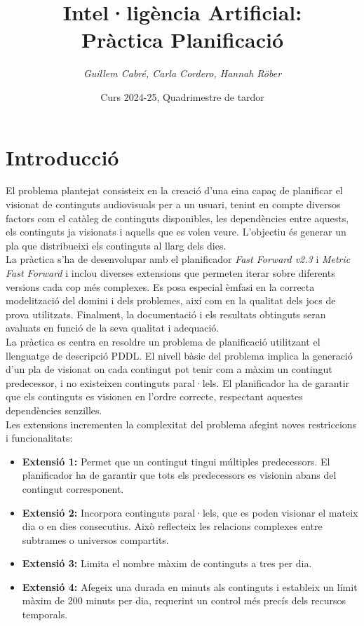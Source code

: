 \documentclass[a4paper]{article}
\title{\textbf{Intel·ligència Artificial:\\
		Pràctica Planificació}}
\author{\emph{Guillem Cabré, Carla Cordero, Hannah Röber}}
\date{Curs 2024-25, Quadrimestre de tardor}
\begin{document}
	
	\begin{titlepage}
		\clearpage\maketitle
		\thispagestyle{empty}
	\end{titlepage}
	
	\tableofcontents
	\clearpage
	
	\section{Introducció}
	
	El problema plantejat consisteix en la creació d'una eina capaç de planificar el visionat de continguts audiovisuals per a un usuari, tenint en compte diversos factors com el catàleg de continguts disponibles, les dependències entre aquests, els continguts ja visionats i aquells que es volen veure. L'objectiu és generar un pla que distribueixi els continguts al llarg dels dies. \\
	
	La pràctica s'ha de desenvolupar amb el planificador \emph{Fast Forward v2.3} i \emph{Metric Fast Forward} i inclou diverses extensions que permeten iterar sobre diferents versions cada cop més complexes. Es posa especial èmfasi en la correcta modelització del domini i dels problemes, així com en la qualitat dels jocs de prova utilitzats. Finalment, la documentació i els resultats obtinguts seran avaluats en funció de la seva qualitat i adequació. \\
	
	La pràctica es centra en resoldre un problema de planificació utilitzant el llenguatge de descripció PDDL. El nivell bàsic del problema implica la generació d'un pla de visionat on cada contingut pot tenir com a màxim un contingut predecessor, i no existeixen continguts paral·lels. El planificador ha de garantir que els continguts es visionen en l'ordre correcte, respectant aquestes dependències senzilles. \\
	
	Les extensions incrementen la complexitat del problema afegint noves restriccions i funcionalitats:
	\begin{itemize}
		\item \textbf{Extensió 1:} Permet que un contingut tingui múltiples predecessors. El planificador ha de garantir que tots els predecessors es visionin abans del contingut corresponent.
		\item \textbf{Extensió 2:} Incorpora continguts paral·lels, que es poden visionar el mateix dia o en dies consecutius. Això reflecteix les relacions complexes entre subtrames o universos compartits.
		\item \textbf{Extensió 3:} Limita el nombre màxim de continguts a tres per dia.
		\item \textbf{Extensió 4:} Afegeix una durada en minuts als continguts i estableix un límit màxim de 200 minuts per dia, requerint un control més precís dels recursos temporals.
	\end{itemize}
	
\end{document}
